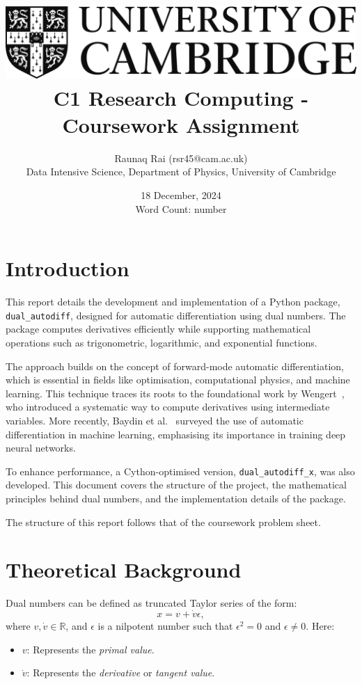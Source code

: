 \documentclass[a4paper,12pt]{article}
\title{
    \includegraphics[scale=0.4]{Cam_logo_bw.png}\\
    \vspace{0.5cm}
    C1 Research Computing - Coursework Assignment
}
\author{Raunaq Rai (rsr45@cam.ac.uk)\\
    Data Intensive Science, Department of Physics, University of Cambridge
}
\date{18 December, 2024 \\ \vspace{0.2cm} {\small Word Count: number}}
\begin{document}
\maketitle

\section*{Introduction}
This report details the development and implementation of a Python package, \texttt{dual\_autodiff}, designed for automatic differentiation using dual numbers. The package computes derivatives efficiently while supporting mathematical operations such as trigonometric, logarithmic, and exponential functions.

The approach builds on the concept of forward-mode automatic differentiation, which is essential in fields like optimisation, computational physics, and machine learning. This technique traces its roots to the foundational work by Wengert~\cite{wengert1964automatic}, who introduced a systematic way to compute derivatives using intermediate variables. More recently, Baydin et al.~\cite{baydin2018automatic} surveyed the use of automatic differentiation in machine learning, emphasising its importance in training deep neural networks.

To enhance performance, a Cython-optimised version, \texttt{dual\_autodiff\_x}, was also developed. This document covers the structure of the project, the mathematical principles behind dual numbers, and the implementation details of the package.

The structure of this report follows that of the coursework problem sheet.

\section*{Theoretical Background}

Dual numbers can be defined as truncated Taylor series of the form:
\begin{equation}
    x = v + \dot{v}\epsilon,
    \label{eq:dual_number_form}
    \end{equation}
where \(v, \dot{v} \in \mathbb{R}\), and \(\epsilon\) is a nilpotent number such that \(\epsilon^2 = 0\) and \(\epsilon \neq 0\). Here:
\begin{itemize}
    \item \(v\): Represents the \textit{primal value}.
    \item \(\dot{v}\): Represents the \textit{derivative} or \textit{tangent value}.
\end{itemize}
\end{document}
